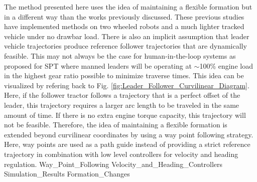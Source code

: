 The method presented here uses the idea of maintaining a flexible formation but in a different way than the works previously discussed. These previous studies have implemented methods on two wheeled robots and a much lighter tracked vehicle under no drawbar load. There is also an implicit assumption that leader vehicle trajectories produce reference follower trajectories that are dynamically feasible. This may not always be the case for human-in-the-loop systems as proposed for SPT where manned leaders will be operating at $\sim$100\% engine load in the highest gear ratio possible to minimize traverse times. This idea can be visualized by refering back to Fig. \ref{fig:Leader_Follower_Curvilinear_Diagram}. Here, if the follower tractor follows a trajectory that is a perfect offset of the leader, this trajectory requires a larger arc length to be traveled in the same amount of time. If there is no extra engine torque capacity, this trajectory will not be feasible. Therefore, the idea of maintaining a flexible formation is extended beyond curvilinear coordinates by using a way point following strategy. Here, way points are used as a path guide instead of providing a strict reference trajectory in combination with low level controllers for velocity and heading regulation. 
{Way_Point_Following}
{Velocity_and_Heading_Controllers}
{Simulation_Results}
{Formation_Changes}